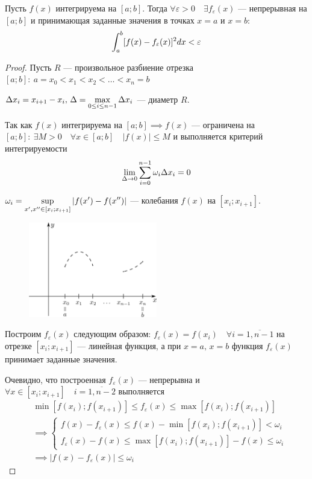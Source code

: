 \begin{theorem}
    Пусть $f(x)$ интегрируема на $[a; b]$. Тогда $\forall \varepsilon > 0 \quad
    \exists f_\varepsilon(x)$ --- непрерывная на $[a; b]$ и принимающая 
    заданные значения в точках $x = a$ и $x = b$:
    \[ \displaystyle\int_a^b [f(x) - f_\varepsilon(x)]^2 dx < \varepsilon \]
\end{theorem}
\begin{proof}
    Пусть $R$ --- произвольное разбиение отрезка $[a; b]: \:
    a = x_0 < x_1 < x_2 < \dots < x_n = b$

    $\Delta x_i = x_{i + 1} - x_i, \, \Delta = \displaystyle\max_{0 \leq i \leq n - 1}
    \Delta x_i$ --- диаметр $R$.

    Так как $f(x)$ интегрируема на $[a; b] \implies f(x)$ --- ограничена на
    $[a; b]: \: \exists M > 0 \quad \forall x \in [a; b] \quad |f(x)| \leq M$
    и выполняется критерий интегрируемости 
    \[ \displaystyle\lim_{\Delta \to 0} \displaystyle\sum_{i = 0}^{n - 1} \omega_i \Delta x_i = 0 \]

    $\omega_i = \displaystyle\sup_{x', x'' \in [x_i; x_{i + 1}]} |f(x') - f(x'')|$ ---
    колебания $f(x)$ на $[x_i; x_{i + 1}]$.

    \begin{figure}[H]
        \centering
        \includegraphics[width=0.5\textwidth]{images/approx_mean.png}
    \end{figure}

    Построим $f_\varepsilon(x)$ следующим образом: $f_\varepsilon(x) = f(x_i)
    \quad \forall i = \overline{1, n - 1}$ на отрезке $[x_i; x_{i + 1}]$ ---
    линейная функция, а при $x = a, \, x = b$ функция $f_\varepsilon(x)$
    принимает заданные значения.

    Очевидно, что построенная $f_\varepsilon(x)$ --- непрерывна и
    $\forall x \in [x_i; x_{i + 1}] \quad i = \overline{1, n - 2}$ выполняется
    \begin{align*}
        &\min [f(x_i); f(x_{i + 1})] \leq 
        f_\varepsilon(x) \leq \max [f(x_i); f(x_{i + 1})] \\
        &\implies \begin{cases}
            f(x) - f_\varepsilon(x) \leq f(x) - \min [f(x_i); f(x_{i + 1})] < \omega_i \\
            f_\varepsilon(x) - f(x) \leq \max [f(x_i); f(x_{i + 1})] - f(x) \leq \omega_i
        \end{cases} \\
        &\implies |f(x) - f_\varepsilon(x)| \leq \omega_i
    \end{align*} 


\end{proof}
